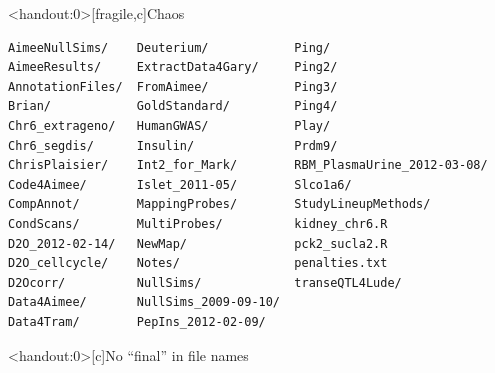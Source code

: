 \documentclass[12pt,t]{beamer}
\begin{document}
\begin{frame}<handout:0>[fragile,c]{Chaos}

\addtocounter{framenumber}{-1}

\begin{center}
\begin{minipage}[c]{11.33cm}
\begin{semiverbatim}
\lstset{basicstyle=\scriptsize}
\begin{lstlisting}[linewidth=11.33cm]
AimeeNullSims/    Deuterium/            Ping/
AimeeResults/     ExtractData4Gary/     Ping2/
AnnotationFiles/  FromAimee/            Ping3/
Brian/            GoldStandard/         Ping4/
Chr6_extrageno/   HumanGWAS/            Play/
Chr6_segdis/      Insulin/              Prdm9/
ChrisPlaisier/    Int2_for_Mark/        RBM_PlasmaUrine_2012-03-08/
Code4Aimee/       Islet_2011-05/        Slco1a6/
CompAnnot/        MappingProbes/        StudyLineupMethods/
CondScans/        MultiProbes/          kidney_chr6.R
D2O_2012-02-14/   NewMap/               pck2_sucla2.R
D2O_cellcycle/    Notes/                penalties.txt
D2Ocorr/          NullSims/             transeQTL4Lude/
Data4Aimee/       NullSims_2009-09-10/
Data4Tram/        PepIns_2012-02-09/
\end{lstlisting}
\end{semiverbatim}
\end{minipage}
\end{center}

\end{frame}



\begin{frame}<handout:0>[c]{No ``{\hilit final}'' in file names}

\vspace*{3mm}

\centering


\end{frame}
\end{document}
